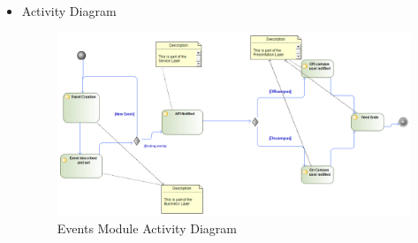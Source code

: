 \documentclass{article}
\begin{document}
\begin{itemize}
					\item Activity Diagram
					\begin{center}
						\begin{figure}[!h]
							\includegraphics[scale=0.4]{Events_Activity_Diagram.png}
							\caption{Events Module Activity Diagram}
						\end{figure}
					\end{center}
										
				\end{itemize}
			
\end{document}
